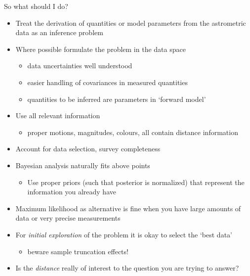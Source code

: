 \documentclass[smaller, aspectratio=169]{beamer}
\begin{document}
%
%
\begin{agaframe}{So what should I do?}
  \begin{itemize}
    \item Treat the derivation of quantities or model parameters from the astrometric data as an
      inference problem
    \item Where possible formulate the problem in the data space
      \begin{itemize}
        \item data uncertainties well understood
        \item easier handling of covariances in measured quantities
        \item quantities to be inferred are parameters in `forward model'
      \end{itemize}
    \item Use all relevant information
      \begin{itemize}
        \item proper motions, magnitudes, colours, all contain distance information
      \end{itemize}
    \item Account for data selection, survey completeness
    \item Bayesian analysis naturally fits above points
      \begin{itemize}
        \item Use proper priors (such that posterior is normalized) that represent the information
          you already have
      \end{itemize}
    \item Maximum likelihood as alternative is fine when you have large amounts of data or very
      precise measurements
    \item For {\em initial exploration} of the problem it is okay to select the `best data'
      \begin{itemize}
        \item beware sample truncation effects!
      \end{itemize}
    \item Is the {\em distance} really of interest to the question you are trying to answer?
  \end{itemize}
\end{agaframe}
%
%
\end{document}
